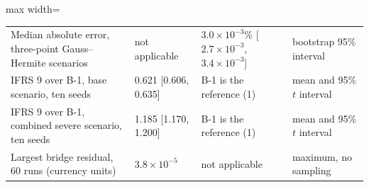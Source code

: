 \begin{table}[tbp]
\begin{adjustbox}{max width=\textwidth}
\begin{tabular}{p{5.4cm}p{3.3cm}p{4.0cm}p{3.0cm}}
Median absolute error, three-point Gauss--Hermite scenarios & not applicable & $3.0\times10^{-3}$\% [$2.7\times10^{-3}$, $3.4\times10^{-3}$] & bootstrap 95\% interval \\
IFRS 9 over B-1, base scenario, ten seeds & 0.621 [0.606, 0.635] & B-1 is the reference (1) & mean and 95\% $t$ interval \\
IFRS 9 over B-1, combined severe scenario, ten seeds & 1.185 [1.170, 1.200] & B-1 is the reference (1) & mean and 95\% $t$ interval \\
Largest bridge residual, 60 runs (currency units) & $3.8\times10^{-5}$ & not applicable & maximum, no sampling \\
\bottomrule
\end{tabular}
\end{adjustbox}
\end{table}
